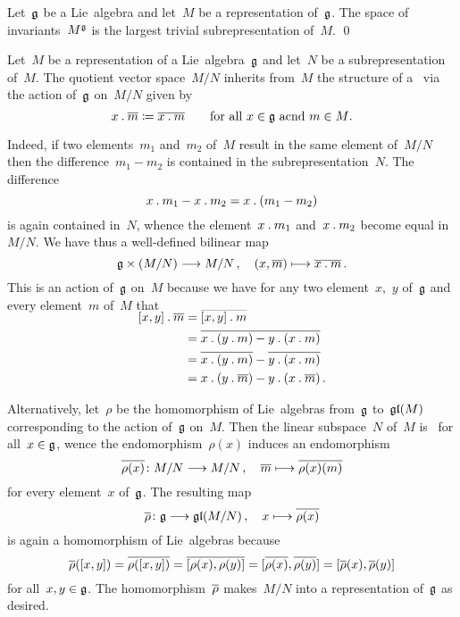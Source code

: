 \begin{proposition}
	Let~$\glie$ be a Lie~algebra and let~$M$ be a representation of~$\glie$.
	The space of invariants~$M^{\mathfrak{g}}$ is the largest trivial subrepresentation of~$M$.
	\qed
\end{proposition}


\begin{example}
	\label{quotient representation}
	Let~$M$ be a representation of a Lie~algebra~$\glie$ and let~$N$ be a subrepresentation of~$M$.
	The quotient vector space~$M/N$ inherits from~$M$ the structure of a~{\representation{$\glie$}} via the action of~$\glie$ on~$M/N$ given by
	\[
		x \mathbin{.} \overline{m}
		\coloneqq
		\overline{x \mathbin{.} m}
		\qquad
		\text{for all~$x \in \mathfrak{g}$ acnd~$m \in M$}.
	\]

	Indeed, if two elements~$m_1$ and~$m_2$ of~$M$ result in the same element of~$M/N$ then the difference~$m_1 - m_2$ is contained in the subrepresentation~$N$.
	The difference
	\[
		x \mathbin{.} m_1 - x \mathbin{.} m_2
		=
		x \mathbin{.} (m_1 - m_2)
	\]
	is again contained in~$N$, whence the element~$x \mathbin{.} m_1$ and~$x \mathbin{.} m_2$ become equal in~$M/N$.
	We have thus a well-defined bilinear map
	\[
		\glie \times (M / N)
		\to
		M / N \,,
		\quad
		(x, \class{m})
		\mapsto
		\class{x \act m} \,.
	\]
	This is an action of~$\glie$ on~$M$ because we have for any two element~$x$,~$y$ of~$\glie$ and every element~$m$ of~$M$ that
	\begin{align*}
		\SwapAboveDisplaySkip
		[x,y] \act \class{m}
		&=
		\class{[x,y] \act m}
		\\
		&=
		\class{x \act (y \act m) - y \act (x \act m)}
		\\
		&=
		\class{x \act (y \act m)} - \class{y \act (x \act m)}
		\\
		&=
		x \act (y \act \class{m}) - y \act (x \act \class{m}) \,.
	\end{align*}
	
	Alternatively, let~$\rho$ be the homomorphism of Lie~algebras from~$\glie$ to~$\mathfrak{gl}(M)$ corresponding to the action of~$\glie$ on~$M$.
	Then the linear subspace~$N$ of~$M$ is~{} for all~$x \in \mathfrak{g}$, wence the endomorphism~$\rho(x)$ induces an endomorphism
	\[
		\induced{\rho(x)}
		\colon
		M/N
		\to
		M/N \,,
		\quad
		\class{m}
		\mapsto
		\class{\rho(x)(m)}
	\]
	for every element~$x$ of~$\glie$.
	The resulting map
	\[
		\induced{\rho}
		\colon
		\glie
		\to
		\gllie(M/N) \,,
		\quad
		x
		\mapsto
		\induced{\rho(x)}
	\]
	is again a homomorphism of Lie~algebras because
	\[
		\overline{\rho}([x,y])
		=
		\overline{\rho([x,y])}
		=
		\overline{[\rho(x), \rho(y)]}
		=
		[\overline{\rho(x)}, \overline{\rho(y)}]
		=
		[\overline{\rho}(x), \overline{\rho}(y)]
	\]
	for all~$x, y \in \mathfrak{g}$.
	The homomorphism~$\overline{\rho}$ makes~$M/N$ into a representation of~$\glie$ as desired.
\end{example}


